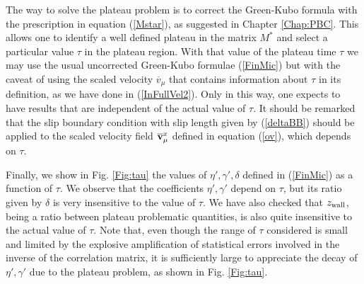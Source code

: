 \documentclass[b5paper,openright,10pt]{book}
\begin{document}
The way  to solve  the plateau  problem is  to correct  the Green-Kubo
formula with the  prescription in equation  (\ref{Mstar}),  as suggested in
Chapter \ref{Chap:PBC}.  This allows one to  identify a well defined plateau in
the matrix $M^*$  and select a particular value $\tau$  in the plateau
region. With  that value  of the  plateau time $\tau$  we may  use the
usual  uncorrected Green-Kubo  formulae  (\ref{FinMic})  but with  the
caveat of  using the scaled velocity  $\overline{v}_\mu$ that contains
information  about  $\tau$ in  its  definition,  as  we have  done  in
(\ref{InFullVel2}). Only in this way,  one expects to have results that
are independent of  the actual value of $\tau$. It  should be remarked
that  the   slip  boundary  condition   with  slip  length   given  by
(\ref{deltaBB})  should  be  applied  to  the  scaled  velocity  field
$\overline{\bf v}_\mu^x$ defined in equation (\ref{ov}), which depends on $\tau$.

Finally,   we   show   in    Fig.    \ref{Fig:tau}   the   values   of
$\eta',\gamma',\delta$  defined in  (\ref{FinMic})  as  a function  of
$\tau$.  We  observe that  the coefficients $\eta',\gamma'$  depend on
$\tau$, but  its ratio given  by $\delta$  is very insensitive  to the
value  of  $\tau$.   We  have  also checked  that  $z_{\rm  wall}$, being a ratio
between plateau problematic quantities,  is also quite
insensitive to the actual value of  $\tau$. Note that, even though the
range  of $\tau$  considered is  small  and limited  by the  explosive
amplification of  statistical errors  involved in  the inverse  of the
correlation matrix, it  is sufficiently large to  appreciate the decay
of $\eta',\gamma'$ due to the plateau problem, as shown in Fig. \ref{Fig:tau}.
\end{document}
